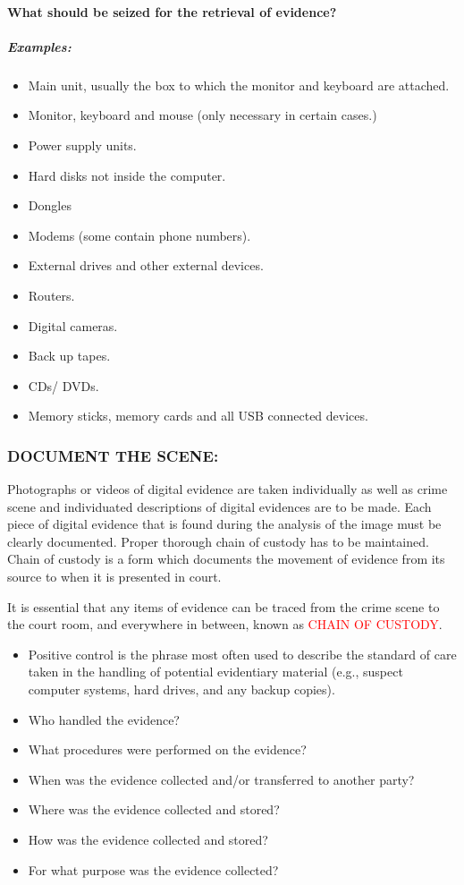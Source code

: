 \documentclass[10pt,british,english]{article}
\begin{document}
\paragraph{What should be seized for the retrieval of evidence?}

\subparagraph{Examples:}
\begin{itemize}
\item Main unit, usually the box to which the monitor and keyboard are attached.
\item Monitor, keyboard and mouse (only necessary in certain cases.)
\item Power supply units.
\item Hard disks not inside the computer.
\item Dongles
\item Modems (some contain phone numbers).
\item External drives and other external devices.
\item Routers. 
\item Digital cameras.
\item Back up tapes.
\item CDs/ DVDs.
\item Memory sticks, memory cards and all USB connected devices.
\end{itemize}

\subsubsection{DOCUMENT THE SCENE:}

Photographs or videos of digital evidence are taken individually as
well as crime scene and individuated descriptions of digital evidences
are to be made. Each piece of digital evidence that is found during
the analysis of the image must be clearly documented. Proper thorough
chain of custody has to be maintained. Chain of custody is a form
which documents the movement of evidence from its source to when it
is presented in court.

It is essential that any items of evidence can be traced from the
crime scene to the court room, and everywhere in between, known as
\textcolor{red}{CHAIN OF CUSTODY}. 
\begin{itemize}
\item Positive control is the phrase most often used to describe the standard
of care taken in the handling of potential evidentiary material (e.g.,
suspect computer systems, hard drives, and any backup copies). 
\item Who handled the evidence? 
\item What procedures were performed on the evidence? 
\item When was the evidence collected and/or transferred to another party? 
\item Where was the evidence collected and stored? 
\item How was the evidence collected and stored? 
\item For what purpose was the evidence collected?
\end{itemize}
\end{document}
